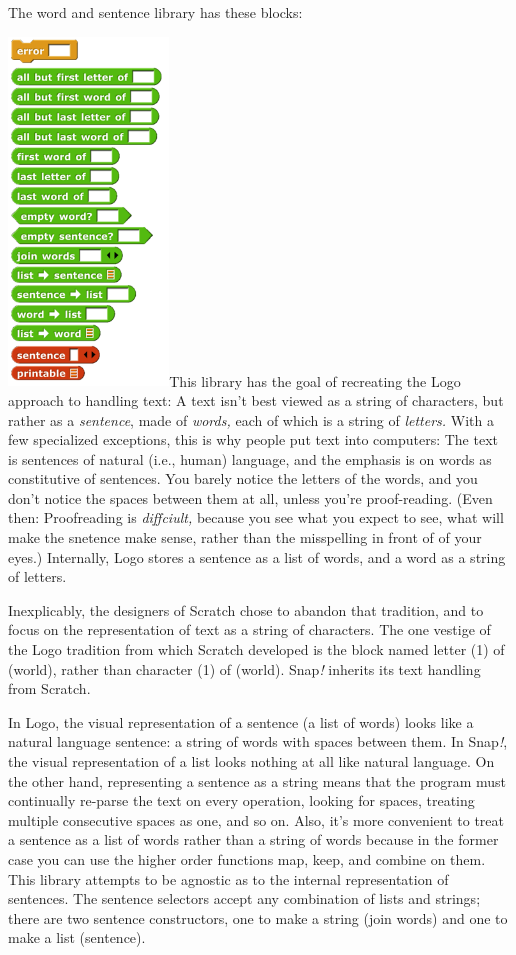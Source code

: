 The \label{wordsent}{}word and sentence library has these
blocks:

\includegraphics[width=1.67986in,height=3.64306in]{media/image394.png}This
library has the goal of recreating the Logo approach to handling text: A
text isn't best viewed as a string of characters, but rather as a
\emph{sentence}, made of \emph{words,} each of which is a string of
\emph{letters.} With a few specialized exceptions, this is why people
put text into computers: The text is sentences of natural (i.e., human)
language, and the emphasis is on words as constitutive of sentences. You
barely notice the letters of the words, and you don't notice the spaces
between them at all, unless you're proof-reading. (Even then:
Proofreading is \emph{diffciult,} because you see what you expect to
see, what will make the snetence make sense, rather than the misspelling
in front of of your eyes.) Internally, Logo stores a sentence as a list
of words, and a word as a string of letters.

Inexplicably, the designers of Scratch chose to abandon that tradition,
and to focus on the representation of text as a string of characters.
The one vestige of the Logo tradition from which Scratch developed is
the block named letter (1) of (world), rather than character (1) of
(world). Snap\emph{!} inherits its text handling from Scratch.

In Logo, the visual representation of a sentence (a list of words) looks
like a natural language sentence: a string of words with spaces between
them. In Snap\emph{!}, the visual representation of a list looks nothing
at all like natural language. On the other hand, representing a sentence
as a string means that the program must continually re-parse the text on
every operation, looking for spaces, treating multiple consecutive
spaces as one, and so on. Also, it's more convenient to treat a sentence
as a list of words rather than a string of words because in the former
case you can use the higher order functions map, keep, and combine on
them. This library attempts to be agnostic as to the internal
representation of sentences. The sentence selectors accept any
combination of lists and strings; there are two sentence constructors,
one to make a string (join words) and one to make a list (sentence).

